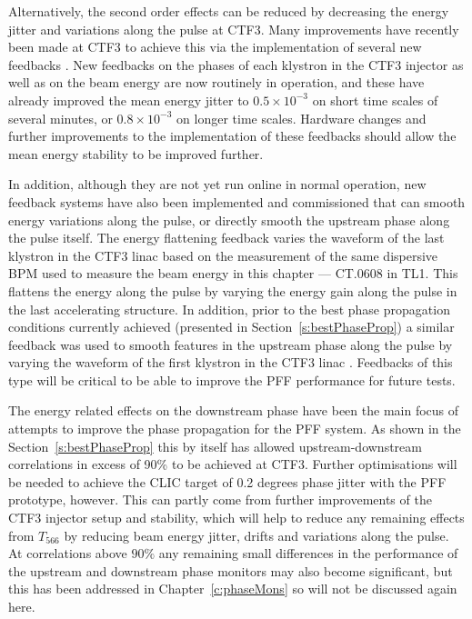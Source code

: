 Alternatively, the second order effects can be reduced by decreasing the energy jitter and variations along the pulse at CTF3. Many improvements have recently been made at CTF3 to achieve this via the implementation of several new feedbacks \cite{lukasIPAC16}. New feedbacks on the phases of each klystron in the CTF3 injector as well as on the beam energy are now routinely in operation, and these have already improved the mean energy jitter to \(0.5\times10^{-3}\) on short time scales of several minutes, or \(0.8\times10^{-3}\) on longer time scales. Hardware changes and further improvements to the implementation of these feedbacks should allow the mean energy stability to be improved further.

In addition, although they are not yet run online in normal operation, new feedback systems have also been implemented and commissioned that can smooth energy variations along the pulse, or directly smooth the upstream phase along the pulse itself. The energy flattening feedback \cite{tobiasPriv} varies the waveform of the last klystron in the CTF3 linac based on the measurement of the same dispersive BPM used to measure the beam energy in this chapter --- CT.0608 in TL1. This flattens the energy along the pulse by varying the energy gain along the pulse in the last accelerating structure. In addition, prior to the best phase propagation conditions currently achieved (presented in Section~\ref{s:bestPhaseProp}) a similar feedback was used to smooth features in the upstream phase along the pulse by varying the waveform of the first klystron in the CTF3 linac \cite{davideThesis}.
 Feedbacks of this type will be critical to be able to improve the PFF performance for future tests.



The energy related effects on the downstream phase have been the main focus of attempts to improve the phase propagation for the PFF system. As shown in the Section~\ref{s:bestPhaseProp} this by itself has allowed upstream-downstream correlations in excess of 90\% to be achieved at CTF3. Further optimisations will be needed to achieve the CLIC target of 0.2 degrees phase jitter with the PFF prototype, however. This can partly come from further improvements of the CTF3 injector setup and stability, which will help to reduce any remaining effects from \(T_{566}\) by reducing beam energy jitter, drifts and variations along the pulse. At correlations above \(90\%\) any remaining small differences in the performance of the upstream and downstream phase monitors may also become significant, but this has been addressed in Chapter~\ref{c:phaseMons} so will not be discussed again here.

